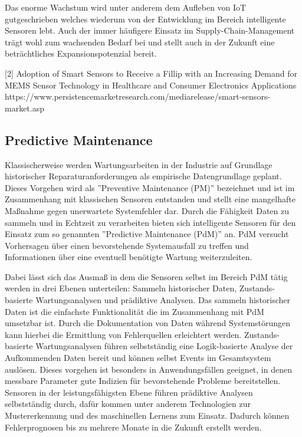 \documentclass[a4paper,12pt]{scrartcl}
\begin{document}
Das enorme Wachstum wird unter anderem dem Aufleben von IoT gutgeschrieben welches wiederum von der Entwicklung im Bereich intelligente Sensoren lebt. Auch der immer häufigere Einsatz im Supply-Chain-Management trägt wohl zum wachsenden Bedarf bei und stellt auch in der Zukunft eine beträchtliches Expansionspotenzial bereit. \cite{https://www.persistencemarketresearch.com/mediarelease/smart-sensors-market.asp}


[2] Adoption of Smart Sensors to Receive a Fillip with an Increasing Demand for MEMS Sensor Technology in Healthcare and Consumer Electronics Applications
https://www.persistencemarketresearch.com/mediarelease/smart-sensors-market.asp

\subsection{Predictive Maintenance}
Klassischerweise werden Wartungsarbeiten in der Industrie auf Grundlage historischer Reparaturanforderungen als empirische Datengrundlage geplant. Dieses Vorgehen wird als ''Preventive Maintenance (PM)'' bezeichnet und ist im Zusammenhang mit klassischen Sensoren entstanden und stellt eine mangelhafte Maßnahme gegen unerwartete Systemfehler dar. Durch die Fähigkeit Daten zu sammeln und in Echtzeit zu verarbeiten bieten sich intelligente Sensoren für den Einsatz zum so genannten ''Predictive Maintenance (PdM)'' an. PdM versucht Vorhersagen über einen bevorstehende Systemausfall zu treffen und Informationen über eine eventuell benötigte Wartung weiterzuleiten. 

\cite{Predictive maintenance of complex system with multi-level reliability structure (Seite 1)} 

Dabei lässt sich das Ausmaß in dem die Sensoren selbst im Bereich PdM tätig werden in drei Ebenen unterteilen: Sammeln historischer Daten, Zustands-basierte Wartungsanalysen und prädiktive Analysen. Das sammeln historischer Daten ist die einfachste Funktionalität die im Zusammenhang mit PdM umsetzbar ist. Durch die Dokumentation von Daten während Systemstörungen kann hierbei die Ermittlung von Fehlerquellen erleichtert werden. Zustands-basierte Wartungsanalysen führen selbstständig eine Logik-basierte Analyse der Aufkommenden Daten bereit und können selbst Events im Gesamtsystem auslösen. Dieses vorgehen ist besonders in Anwendungsfällen geeignet, in denen messbare Parameter gute Indizien für bevorstehende Probleme bereitstellen. Sensoren in der leistungsfähigsten Ebene führen prädiktive Analysen selbstständig durch, dafür kommen unter anderem Technologien zur Mustererkennung und des maschinellen Lernens zum Einsatz. Dadurch können Fehlerprognosen bis zu mehrere Monate in die Zukunft erstellt werden. 
\end{document}
